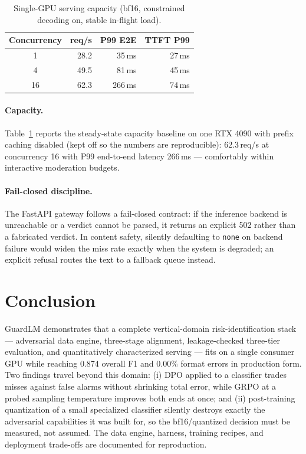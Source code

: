 \documentclass[11pt]{article}
\begin{document}
\begin{table}[t]
\centering\small
\begin{tabular}{crrr}
\toprule
Concurrency & req/s & P99 E2E & TTFT P99 \\
\midrule
1 & 28.2 & 35\,ms & 27\,ms \\
4 & 49.5 & 81\,ms & 45\,ms \\
16 & 62.3 & 266\,ms & 74\,ms \\
\bottomrule
\end{tabular}
\caption{Single-GPU serving capacity (bf16, constrained decoding on, stable in-flight load).}
\label{tab:capacity}
\end{table}

\paragraph{Capacity.}
Table~\ref{tab:capacity} reports the steady-state capacity baseline on one RTX 4090 with prefix caching disabled (kept off so the numbers are reproducible): 62.3\,req/s at concurrency 16 with P99 end-to-end latency 266\,ms --- comfortably within interactive moderation budgets.

\paragraph{Fail-closed discipline.}
The FastAPI gateway follows a fail-closed contract: if the inference backend is unreachable or a verdict cannot be parsed, it returns an explicit 502 rather than a fabricated verdict. In content safety, silently defaulting to \texttt{none} on backend failure would widen the miss rate exactly when the system is degraded; an explicit refusal routes the text to a fallback queue instead.

\section{Conclusion}

GuardLM demonstrates that a complete vertical-domain risk-identification stack --- adversarial data engine, three-stage alignment, leakage-checked three-tier evaluation, and quantitatively characterized serving --- fits on a single consumer GPU while reaching 0.874 overall F1 and 0.00\% format errors in production form. Two findings travel beyond this domain: (i) DPO applied to a classifier trades misses against false alarms without shrinking total error, while GRPO at a probed sampling temperature improves both ends at once; and (ii) post-training quantization of a small specialized classifier silently destroys exactly the adversarial capabilities it was built for, so the bf16/quantized decision must be measured, not assumed. The data engine, harness, training recipes, and deployment trade-offs are documented for reproduction.
\end{document}
